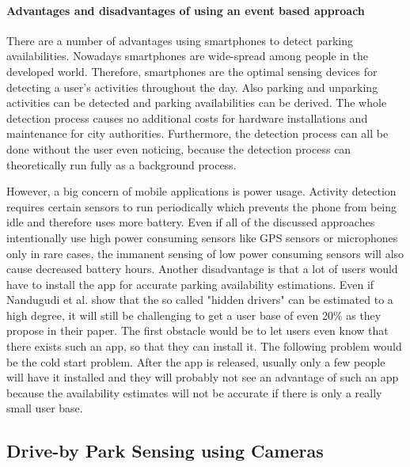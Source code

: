 \paragraph{Advantages and disadvantages of using an event based approach}

There are a number of advantages using smartphones to detect parking availabilities. Nowadays smartphones are wide-spread among people in the developed world. Therefore, smartphones are the optimal sensing devices for detecting a user's activities throughout the day. Also parking and unparking activities can be detected and parking availabilities can be derived. The whole detection process causes no additional costs for hardware installations and maintenance for city authorities. Furthermore, the detection process can all be done without the user even noticing, because the detection process can theoretically run fully as a background process.

However, a big concern of mobile applications is power usage. Activity detection requires certain sensors to run periodically which prevents the phone from being idle and therefore uses more battery. Even if all of the discussed approaches intentionally use high power consuming sensors like GPS sensors or microphones only in rare cases, the immanent sensing of low power consuming sensors will also cause decreased battery hours. Another disadvantage is that a lot of users would have to install the app for accurate parking availability estimations. Even if Nandugudi et al. \cite{Nandugudi:2014:PPP:2632048.2632098} show that the so called "hidden drivers" can be estimated to a high degree, it will still be challenging to get a user base of even 20\% as they propose in their paper. The first obstacle would be to let users even know that there exists such an app, so that they can install it. The following problem would be the cold start problem. After the app is released, usually only a few people will have it installed and they will probably not see an advantage of such an app because the availability estimates will not be accurate if there is only a really small user base.







\subsection{Drive-by Park Sensing using Cameras}
\label{sec:related_driveby_park_sensing_cameras}

